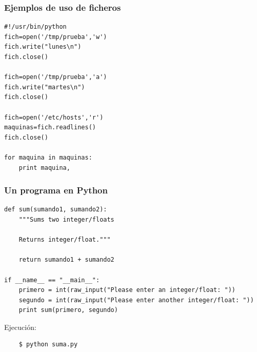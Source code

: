 \documentclass{beamer}
\begin{document}
\begin{frame}[fragile]
\frametitle{Ejemplos de uso de ficheros}

\begin{footnotesize}
\begin{verbatim}
#!/usr/bin/python
fich=open('/tmp/prueba','w')
fich.write("lunes\n")
fich.close()

fich=open('/tmp/prueba','a')
fich.write("martes\n")
fich.close()

fich=open('/etc/hosts','r')
maquinas=fich.readlines()
fich.close()

for maquina in maquinas:
    print maquina,

\end{verbatim}
\end{footnotesize}
\end{frame}



\begin{frame}[fragile]
\frametitle{Un programa en Python}

\begin{footnotesize}
\begin{verbatim}
def sum(sumando1, sumando2):
    """Sums two integer/floats

    Returns integer/float."""

    return sumando1 + sumando2

if __name__ == "__main__":
    primero = int(raw_input("Please enter an integer/float: "))
    segundo = int(raw_input("Please enter another integer/float: "))
    print sum(primero, segundo) 

\end{verbatim}
\end{footnotesize}

Ejecución:
\begin{footnotesize}
\begin{verbatim}
    $ python suma.py
\end{verbatim}
\end{footnotesize}
 
\end{frame}
\end{document}
